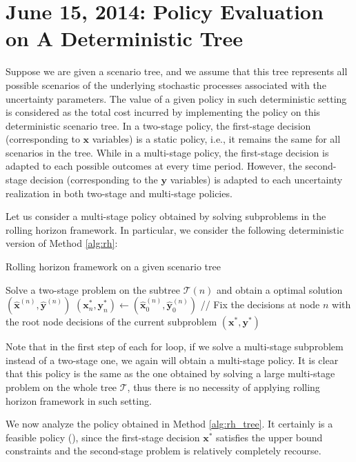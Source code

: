 \documentclass[10pt]{article}
\theoremstyle{plain}
\theoremstyle{definition}
\theoremstyle{remark}
\newcommand{\bx}{\mathbf{x}}
\newcommand{\by}{\mathbf{y}}
\newcommand{\T}{\mathcal{T}}
\begin{document}
\section*{June 15, 2014: Policy Evaluation on A Deterministic Tree}
Suppose we are given a scenario tree, and we assume that this tree represents all possible
scenarios of the underlying stochastic processes associated with the uncertainty parameters.
The value of a given policy in such deterministic setting is considered as the total cost incurred
by implementing the policy on this deterministic scenario tree. In a two-stage policy, the first-stage
decision (corresponding to $\bx$ variables) is a static policy, i.e., it remains the same
for all scenarios in the tree. While in a multi-stage policy, the first-stage decision is adapted to
each possible outcomes at every time period.
However, the second-stage decision (corresponding to the $\by$ variables) is adapted to
each uncertainty realization in both two-stage and multi-stage policies.

Let us consider a multi-stage policy obtained by solving subproblems in the rolling horizon
framework. In particular, we consider the following deterministic version of Method \ref{alg:rh}:
\begin{algorithm}
\caption{Rolling horizon framework on a given scenario tree}
  \label{alg:rh_tree}
  \begin{algorithmic}
    \FOR {each node $n$ in $\T$}
    \STATE Solve a two-stage problem on the subtree $\T(n)$ and obtain a optimal solution
    $(\hat{\bx}^{(n)}, \hat{\by}^{(n)})$
    \STATE $(\bx^*_n, \by^*_n) \gets (\hat{\bx}^{(n)}_0,\hat{\by}^{(n)}_0)$
    // Fix the decisions at node $n$ with the root node decisions of the current subproblem
    \ENDFOR
    \RETURN $(\bx^*, \by^*)$
  \end{algorithmic}
\end{algorithm}


Note that in the first step of each for loop, if we solve a multi-stage subproblem instead of a
two-stage one, we again will obtain a multi-stage policy. It is clear that this policy is the same
as the one obtained by solving a large multi-stage problem on the whole tree $\T$, thus there
is no necessity of applying rolling horizon framework in such setting.

We now analyze the policy obtained in Method \ref{alg:rh_tree}.
It certainly is a feasible policy ({\color{rred}{not only the approximation problem on the tree,
but also the true problem?}}),
since the first-stage decision $\bx^*$ satisfies the upper bound
constraints and the second-stage problem is relatively completely recourse.
\end{document}
